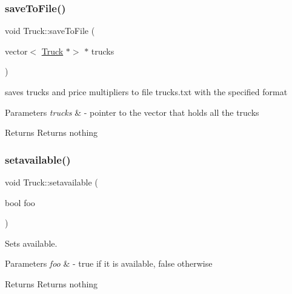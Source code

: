 \subsubsection{\texorpdfstring{save\+To\+File()}{saveToFile()}}
{\footnotesize\ttfamily void Truck\+::save\+To\+File (\begin{DoxyParamCaption}\item[{vector$<$ \hyperlink{class_truck}{Truck} $\ast$$>$ $\ast$}]{trucks }\end{DoxyParamCaption})\hspace{0.3cm}{\ttfamily [static]}}



saves trucks and price multipliers to file trucks.\+txt with the specified format 


\begin{DoxyParams}{Parameters}
{\em trucks} & -\/ pointer to the vector that holds all the trucks \\
\hline
\end{DoxyParams}
\begin{DoxyReturn}{Returns}
Returns nothing 
\end{DoxyReturn}
\mbox{\label{class_truck_a59ca935a364da118131ed85647aa4f0d}} 
\subsubsection{\texorpdfstring{setavailable()}{setavailable()}}
{\footnotesize\ttfamily void Truck\+::setavailable (\begin{DoxyParamCaption}\item[{bool}]{foo }\end{DoxyParamCaption})}



Sets available. 


\begin{DoxyParams}{Parameters}
{\em foo} & -\/ true if it is available, false otherwise \\
\hline
\end{DoxyParams}
\begin{DoxyReturn}{Returns}
Returns nothing 
\end{DoxyReturn}
\mbox{\label{class_truck_ac26288a4d560deb5383fd07618fb13e6}} 
